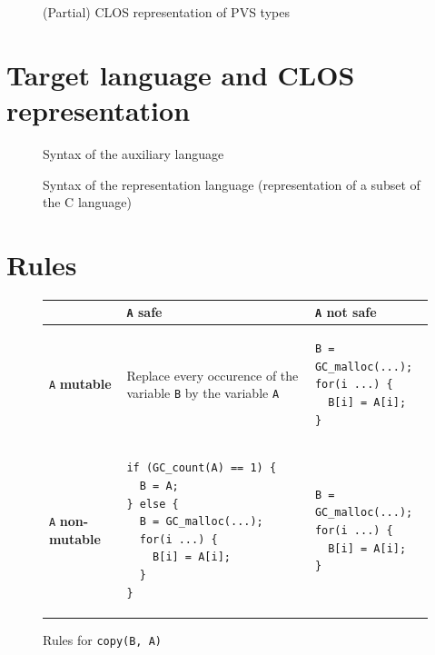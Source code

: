 \documentclass[12pt,a4paper,titlepage]{article}
\newcommand{\cl}[1]{\texttt{#1}}
\newcommand{\mut}{  \textbf{ mutable } }
\newcommand{\nmut}{ \textbf{ non-mutable } }
\newcommand{\safe}{ \textbf{ safe } }
\begin{document}
\begin{figure}[h!]

\caption{(Partial) CLOS representation of PVS types}
\label{fig:PVS-CLOS-types}
\end{figure}


\newpage
\section{Target language and CLOS representation}


\begin{figure}[h!]

\caption{Syntax of the auxiliary language}
\label{fig:Csyntax}
\end{figure}

\newpage
\begin{figure}[h!]

\caption{Syntax of the representation language (representation of a subset of the C language)}
\label{fig:Csyntax}
\end{figure}


\newpage
\section{Rules}
\label{Rules}


\begin{figure}[h!]
\begin{tabular}{|p{5.5cm}|p{5.5cm}|p{6cm}|}
\hline
             & \cl{A} \safe & \cl{A} not \safe \\ \hline
\cl{A} \mut  & Replace every occurence of the variable \cl{B} by the variable \cl{A} & \begin{lstlisting}
B = GC_malloc(...);
for(i ...) {
  B[i] = A[i];
}
\end{lstlisting} \\ \hline
\cl{A} \nmut & \begin{lstlisting}
if (GC_count(A) == 1) {
  B = A;
} else {
  B = GC_malloc(...);
  for(i ...) {
    B[i] = A[i];
  }
}
\end{lstlisting} & \begin{lstlisting}
B = GC_malloc(...);
for(i ...) {
  B[i] = A[i];
}
\end{lstlisting} \\ \hline
\end{tabular}
\caption{Rules for \cl{copy(B, A)}}
\end{figure}
\end{document}
